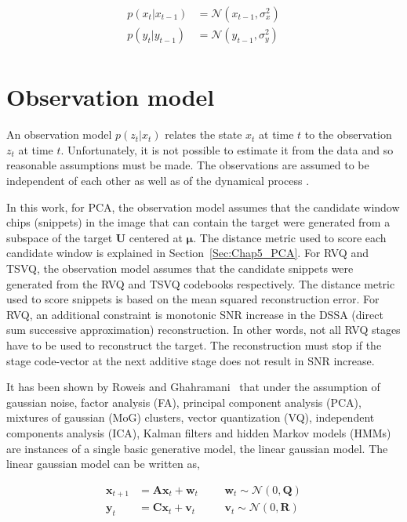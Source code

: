 \begin{align*}
p(x_t|x_{t-1}) &= \mathcal{N}(x_{t-1}, \sigma_x^2) \\
p(y_t|y_{t-1}) &= \mathcal{N}(y_{t-1}, \sigma_y^2) \\
\end{align*}

\section{Observation model}
An observation model $p(z_t|x_t)$ relates the state $x_t$ at time $t$ to the observation $z_t$ at time $t$.  Unfortunately, it is not possible to estimate it from the data and so reasonable assumptions must be made.  The observations are assumed to be independent of each other as well as of the dynamical process \cite{1998_JNL_Condensation_IsardBlake}. 

In this work, for PCA, the observation model assumes that the candidate window chips (snippets) in the image that can contain the target were generated from a subspace of the target $\mathbf{U}$ centered at $\mathbf{\mu}$.  The distance metric used to score each candidate window is explained in Section~\ref{Sec:Chap5_PCA}.  For RVQ and TSVQ, the observation model assumes that the candidate snippets were generated from the RVQ and TSVQ codebooks respectively.  The distance metric used to score snippets is based on the mean squared reconstruction error.  For RVQ, an additional constraint is monotonic SNR increase in the DSSA (direct sum successive approximation) reconstruction.  In other words, not all RVQ stages have to be used to reconstruct the target.  The reconstruction must stop if the stage code-vector at the next additive stage does not result in SNR increase.


It has been shown by Roweis and Ghahramani~\cite{1999_JNL_Gaussian_roweis} that under the assumption of gaussian noise, factor analysis (FA), principal component analysis (PCA), mixtures of gaussian (MoG) clusters, vector quantization (VQ), independent components analysis (ICA), Kalman filters and hidden Markov models (HMMs) are instances of a single basic generative model, the linear gaussian model.  The linear gaussian model can be written as,

\begin{equation}
\begin{array}{llllllllllllll}
\mathbf{x}_{t+1} &=  \mathbf{A}\mathbf{x}_{t} +  \mathbf{w}_t   & & & \mathbf{w}_t \sim \mathcal{N}(0, \mathbf{Q})\\
\mathbf{y}_t 		 &=  \mathbf{C}\mathbf{x}_{t} +  \mathbf{v}_t    & & & \mathbf{v}_t \sim \mathcal{N}(0, \mathbf{R})
\end{array}
\label{LGM}
\end{equation}

